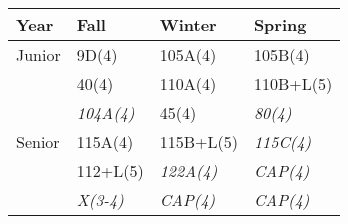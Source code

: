 \documentclass[12pt]{article}
\begin{document}
\label{tbl:proposed-transfers}
\begin{center}
\begin{tabular}{|l|l|l|l|}
\hline
Year      & Fall    & Winter & Spring \\
\hline
Junior   & 9D(4)         & 105A(4)   & 105B(4) \\
         & 40(4)         & 110A(4)   & 110B+L(5) \\         
         & {\it 104A(4)} & 45(4)     & {\it 80(4)} \\
\hline
Senior   & 115A(4)    & 115B+L(5)      & {\it 115C(4)} \\
         & 112+L(5)   & {\it 122A(4)} & {\it CAP(4)} \\
         & {\it X(3-4)} & {\it CAP(4)}   & {\it CAP(4)}  \\
\hline 
\end{tabular}
\end{center}

\newpage
\end{document}
